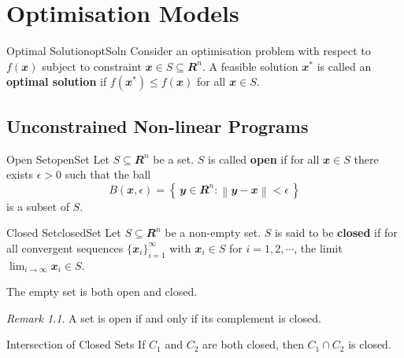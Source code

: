 \documentclass[math]{amznotes}
\theoremstyle{remark}
\newtheorem*{remark}{Remark}
\begin{document}
\tableofcontents

\chapter{Optimisation Models}
\begin{dfnbox}{Optimal Solution}{optSoln}
    Consider an optimisation problem with respect to $f(\mathbfit{x})$ subject to constraint $\mathbfit{x} \in S \subseteq \mathbfit{R}^n$. A feasible solution $\mathbfit{x}^*$ is called an {\color{red} \textbf{optimal solution}} if $f(\mathbfit{x}^*) \leq f(\mathbfit{x})$ for all $\mathbfit{x} \in S$.
\end{dfnbox}
\section{Unconstrained Non-linear Programs}
\begin{dfnbox}{Open Set}{openSet}
    Let $S \subseteq \mathbfit{R}^n$ be a set. $S$ is called {\color{red} \textbf{open}} if for all $\mathbfit{x} \in S$ there exists $\epsilon > 0$ such that the ball 
    \begin{equation*}
        B(\mathbfit{x}, \epsilon) = \left\{ \, \mathbfit{y} \in \mathbfit{R}^n \colon \left\lVert \mathbfit{y - x} \right\rVert < \epsilon \, \right\}
    \end{equation*}
    is a subset of $S$.
\end{dfnbox}
\begin{dfnbox}{Closed Set}{closedSet}
    Let $S \subseteq \mathbfit{R}^n$ be a non-empty set. $S$ is said to be {\color{red} \textbf{closed}} if for all convergent sequences $\{\mathbfit{x}_i\}_{i = 1}^{\infty}$ with $\mathbfit{x}_i \in S$ for $i = 1, 2, \cdots$, the limit $\lim_{i \to \infty} \mathbfit{x}_i \in S$.
\end{dfnbox}
The empty set is both open and closed.
\begin{notebox}
    \begin{remark}
        A set is open if and only if its complement is closed.
    \end{remark}
\end{notebox}
\begin{thmbox}{Intersection of Closed Sets}{}
    If $C_1$ and $C_2$ are both closed, then $C_1 \cap C_2$ is closed.
\end{thmbox}
\begin{thmbox}{}{}
    
\end{thmbox}
\end{document}
